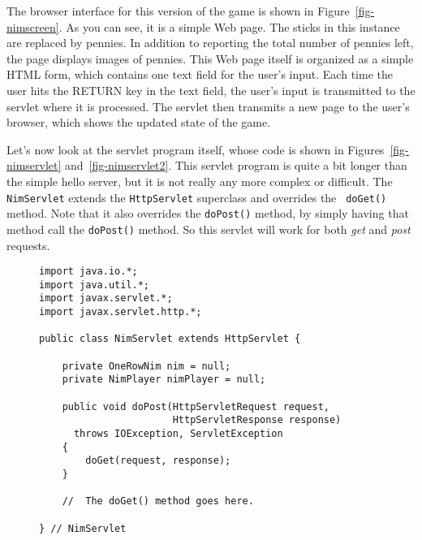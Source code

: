The browser interface for this version of the game is shown in
Figure~\ref{fig-nimscreen}. As you can see, it is a simple Web
page. The sticks in this instance are replaced by pennies. In addition
to reporting the total number of pennies left, the page displays
images of pennies. This Web page itself is organized as a simple HTML
form, which contains one text field for the user's input.  Each time
the user hits the RETURN key in the text field, the user's input is
transmitted to the servlet where it is processed.  The servlet then
transmits a new page to the user's browser, which shows the updated
state of the game. 

Let's now look at the servlet program itself, whose code is shown in
Figures~\ref{fig-nimservlet} and~\ref{fig-nimservlet2}.  This servlet
program is quite a bit longer than the simple hello server, but it is
not really any more complex or difficult.  The {\tt NimServlet}
extends the {\tt HttpServlet} superclass and overrides the {\tt
doGet()} method.  Note that it also overrides the {\tt doPost()}
method, by simply having that method call the {\tt doPost()} method. So
this servlet will work for both {\em get} and {\em post} requests.

\begin{figure}[tb]
\jjjprogstart
\begin{jjjlisting}
\begin{lstlisting}
import java.io.*;
import java.util.*;
import javax.servlet.*;
import javax.servlet.http.*;

public class NimServlet extends HttpServlet {
    
    private OneRowNim nim = null;
    private NimPlayer nimPlayer = null;

    public void doPost(HttpServletRequest request, 
                       HttpServletResponse response)
      throws IOException, ServletException
    {
        doGet(request, response);
    }

    //  The doGet() method goes here.

} // NimServlet
\end{lstlisting}
\end{jjjlisting}
\end{figure}


